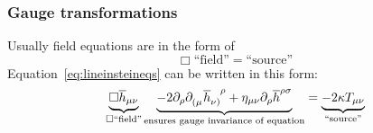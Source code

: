 \subsubsection{Gauge transformations}
Usually field equations are in the form of
\begin{equation}
    \Box \text{``field''} = \text{``source''}
\end{equation}
Equation~\eqref{eq:lineinsteineqs} can be written in this form:
\begin{equation}
    \underbrace{\Box \overline{h}_{\mu\nu}}_{\Box\text{``field''}}
    \underbrace{- 2 \partial_\rho \tensor{\partial}{_(_\mu} \tensor{\overline{h}}{_\nu_)^\rho}
    + \eta_{\mu\nu}\partial_\rho \overline{h}^{\rho\sigma}}_{\text{ensures gauge invariance of equation}}
    = \underbrace{-2\kappa T_{\mu\nu}}_{\text{``source''}}
\end{equation}


